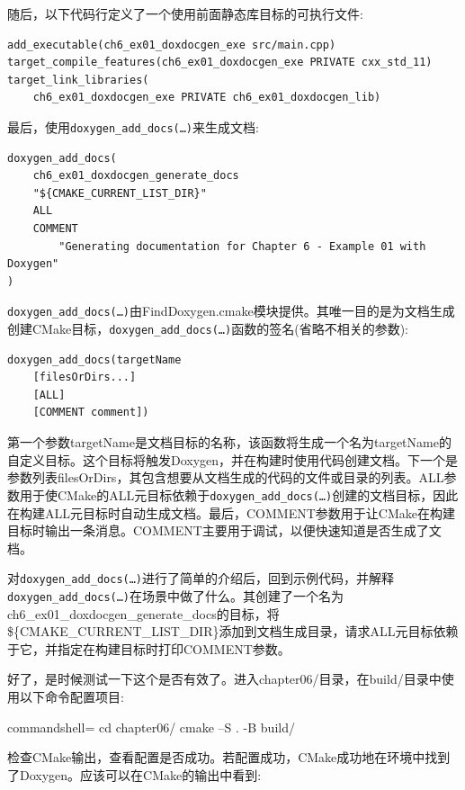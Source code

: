 随后，以下代码行定义了一个使用前面静态库目标的可执行文件:

\begin{lstlisting}[style=styleCMake]
add_executable(ch6_ex01_doxdocgen_exe src/main.cpp)
target_compile_features(ch6_ex01_doxdocgen_exe PRIVATE cxx_std_11)
target_link_libraries(
	ch6_ex01_doxdocgen_exe PRIVATE ch6_ex01_doxdocgen_lib)
\end{lstlisting}

最后，使用\texttt{doxygen\_add\_docs(…)}来生成文档:

\begin{lstlisting}[style=styleCMake]
doxygen_add_docs(
	ch6_ex01_doxdocgen_generate_docs
	"${CMAKE_CURRENT_LIST_DIR}"
	ALL
	COMMENT
		"Generating documentation for Chapter 6 - Example 01 with Doxygen"
)
\end{lstlisting}
 
\texttt{doxygen\_add\_docs(…)}由FindDoxygen.cmake模块提供。其唯一目的是为文档生成创建CMake目标，\texttt{doxygen\_add\_docs(…)}函数的签名(省略不相关的参数):

\begin{lstlisting}[style=styleCMake]
doxygen_add_docs(targetName
	[filesOrDirs...]
	[ALL]
	[COMMENT comment])
\end{lstlisting}

第一个参数targetName是文档目标的名称，该函数将生成一个名为targetName的自定义目标。这个目标将触发Doxygen，并在构建时使用代码创建文档。下一个是参数列表filesOrDirs，其包含想要从文档生成的代码的文件或目录的列表。ALL参数用于使CMake的ALL元目标依赖于\texttt{doxygen\_add\_docs(…)}创建的文档目标，因此在构建ALL元目标时自动生成文档。最后，COMMENT参数用于让CMake在构建目标时输出一条消息。COMMENT主要用于调试，以便快速知道是否生成了文档。

对\texttt{doxygen\_add\_docs(…)}进行了简单的介绍后，回到示例代码，并解释\texttt{doxygen\_add\_docs(…)}在场景中做了什么。其创建了一个名为ch6\_ex01\_doxdocgen\_generate\_docs的目标，将\$\{CMAKE\_CURRENT\_LIST\_DIR\}添加到文档生成目录，请求ALL元目标依赖于它，并指定在构建目标时打印COMMENT参数。

好了，是时候测试一下这个是否有效了。进入chapter06/目录，在build/目录中使用以下命令配置项目:

\begin{tcblisting}{commandshell={}}
cd chapter06/
cmake –S . -B build/
\end{tcblisting}

检查CMake输出，查看配置是否成功。若配置成功，CMake成功地在环境中找到了Doxygen。应该可以在CMake的输出中看到:

